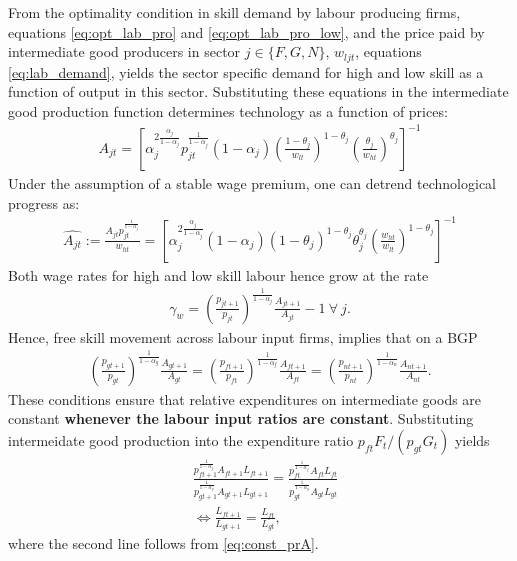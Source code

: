 From the optimality condition in skill demand by labour producing firms, equations \ref{eq:opt_lab_pro} and \ref{eq:opt_lab_pro_low}, and the price paid by intermediate good producers in sector $j\in\{F, G, N\}$, $w_{ljt}$, equations \ref{eq:lab_demand}, yields the sector specific demand for high and low skill as a function of output in this sector. Substituting these equations in the intermediate good production function determines technology as a function of prices:
\begin{align}
A_{jt} = \left[\alpha_j^{2\frac{\alpha_j}{1-\alpha_j}}p_{jt}^\frac{1}{1-\alpha_j}(1-\alpha_j)\left(\frac{1-\theta_j}{w_{lt}}\right)^{1-\theta_j}\left(\frac{\theta_j}{w_{ht}}\right)^{\theta_j}\right] ^{-1}
\end{align}
Under the assumption of a stable wage premium, one can detrend technological progress as:
\begin{align}
\hat{A_{jt}}:=\frac{A_{jt}p_{jt}^\frac{1}{1-\alpha_j}}{w_{ht}}= \left[\alpha_j^{2\frac{\alpha_j}{1-\alpha_j}}(1-\alpha_j)\left(1-\theta_j\right)^{1-\theta_j}\theta_j^{\theta_j}\left(\frac{w_{ht}}{w_{lt}}\right)^{1-\theta_j}\right] ^{-1}\label{eq:A_det}
\end{align}
Both wage rates for high and low skill labour hence grow at the rate
\begin{align}
\gamma_{w}=\left(\frac{p_{jt+1}}{p_{jt}}\right)^\frac{1}{1-\alpha_j}\frac{A_{jt+1}}{A_{jt}}-1  \ \forall \ j. 
\end{align}
Hence, free skill movement across labour input firms, implies that on a BGP
\begin{align}
\left(\frac{p_{gt+1}}{p_{gt}}\right)^\frac{1}{1-\alpha_g}\frac{A_{gt+1}}{A_{gt}}=\left(\frac{p_{ft+1}}{p_{ft}}\right)^\frac{1}{1-\alpha_f}\frac{A_{ft+1}}{A_{ft}}=\left(\frac{p_{nt+1}}{p_{nt}}\right)^\frac{1}{1-\alpha_n}\frac{A_{nt+1}}{A_{nt}}. \label{eq:const_prA} 
\end{align}
These conditions ensure that relative expenditures on intermediate goods are constant \textbf{whenever the labour input ratios are constant}. Substituting intermeidate good production into the expenditure ratio $p_{ft}F_t/(p_{gt}G_t)$  yields
\begin{align}
&\frac{p_{ft+1}^\frac{1}{1-\alpha_f}A_{ft+1}L_{ft+1}}{p_{gt+1}^\frac{1}{1-\alpha_g}A_{gt+1}L_{gt+1}}= \frac{p_{ft}^\frac{1}{1-\alpha_f}A_{ft}L_{ft}}{p_{gt}^\frac{1}{1-\alpha_g}A_{gt}L_{gt}}\\
&\Leftrightarrow \frac{L_{ft+1}}{L_{gt+1}}=\frac{L_{ft}}{L_{gt}},
\end{align}
where the second line follows from \ref{eq:const_prA}. 

